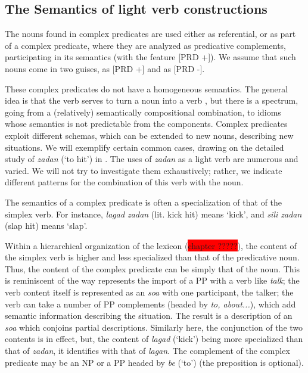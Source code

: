 \documentclass[output=paper
	        ,collection
	        ,collectionchapter
 	        ,biblatex
                ,babelshorthands
                ,newtxmath
                ,draftmode
                ,colorlinks, citecolor=brown
]{langscibook}
\begin{document}
{\subsection{The Semantics of light verb constructions}\label{GSsection5.3}

The nouns found in complex predicates are used either as referential, or as part of a complex predicate, where they are analyzed as predicative complements, participating in its semantics (with the feature [PRD +]). We assume that such nouns come in two guises, as [PRD +] and as [PRD -]. 

These complex predicates do not have a homogeneous semantics. The general idea is that the verb serves to turn a noun into a verb \citep{bonami2010persian}, but there is a spectrum, going from a (relatively) semantically compositional combination, to idioms whose semantics is not predictable from the components. Complex predicates exploit different schemas, which can be extended to new nouns, describing new situations. We will exemplify certain common cases, drawing on the detailed study of \emph{zadan} (`to hit') in \cite{pollet2012grammaire}. The uses of \emph{zadan} as a light verb are numerous and varied. We will not try to investigate them exhaustively; rather, we indicate different patterns for the combination of this verb with the noun. 

The semantics of a complex predicate is often a specialization of that of the simplex verb. For instance, \emph{lagad zadan} (lit. kick hit) means `kick', and \emph{sili zadan} (slap hit) means `slap'. 

\z

Within a hierarchical organization of the lexicon (\colorbox{red}{chapter ?????}), the content of the simplex verb is higher and less specialized than that of the predicative noun. Thus, the content of the complex predicate can be simply that of the noun. This is reminiscent of the way \cite{Wechsler1995c} represents the import of a PP with a verb like \emph{talk}; the verb content itself is represented as an \emph{soa} with one participant, the talker; the verb can take a number of PP complements (headed by \emph{to, about...}), which add semantic information describing the situation. The result is a description of an \emph{soa} which conjoins partial descriptions. Similarly here, the conjunction of the two contents is in effect, but, the content of \emph{lagad} (`kick') being more specialized than that of \emph{zadan}, it identifies with that of \emph{lagan}. The complement of the complex predicate may be an NP or a PP headed by \emph{be} (`to') (the preposition is optional).


}
\end{document}
